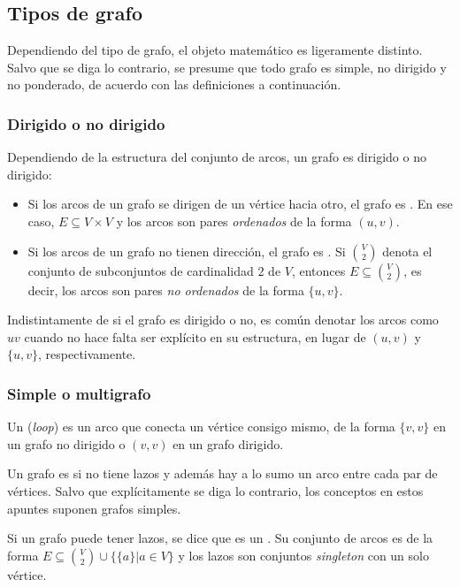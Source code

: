 
\subsection{Tipos de grafo}
\label{sec:tipos_de_grafo}

Dependiendo del tipo de grafo, el objeto matemático es ligeramente distinto. Salvo que se diga lo contrario, se presume que todo grafo es simple, no dirigido y no ponderado, de acuerdo con las definiciones a continuación.

\subsubsection{Dirigido o no dirigido}
\label{sec:dirigido_vs_no_dirigido}

Dependiendo de la estructura del conjunto de arcos, un grafo es dirigido o no dirigido:

\begin{itemize}
  \item Si los arcos de un grafo se dirigen de un vértice hacia otro, el grafo es . En ese caso, $E \subseteq V \times V$ y los arcos son pares \emph{ordenados} de la forma $(u,v)$.
  \item Si los arcos de un grafo no tienen dirección, el grafo es . Si $\binom{V}{2}$ denota el conjunto de subconjuntos de cardinalidad $2$ de $V$, entonces $E \subseteq \binom{V}{2}$, es decir, los arcos son pares \emph{no ordenados} de la forma $\{u,v\}$.
\end{itemize}

Indistintamente de si el grafo es dirigido o no, es común denotar los arcos como $uv$ cuando no hace falta ser explícito en su estructura, en lugar de $(u,v)$ y $\{u,v\}$, respectivamente.

\subsubsection{Simple o multigrafo}
\label{sec:simple_o_multigrafo}

Un  (\textit{loop}) es un arco que conecta un vértice consigo mismo, de la forma $\{v, v\}$ en un grafo no dirigido o $(v, v)$ en un grafo dirigido.

Un grafo es  si no tiene lazos y además hay a lo sumo un arco entre cada par de vértices. Salvo que explícitamente se diga lo contrario, los conceptos en estos apuntes suponen grafos simples.

Si un grafo puede tener lazos, se dice que es un . Su conjunto de arcos es de la forma $E \subseteq \binom{V}{2} \cup \{\{a\}|a\in V\}$ y los lazos son conjuntos \textit{singleton} con un solo vértice.

